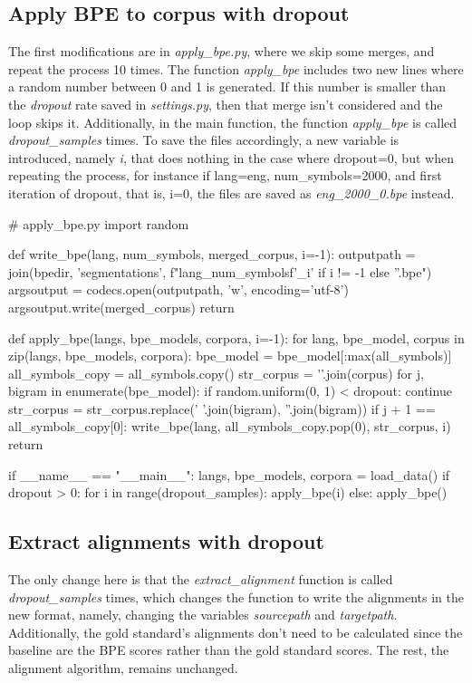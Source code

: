 \subsection{Apply BPE to corpus with dropout}

The first modifications are in \emph{apply\_bpe.py}, where we skip some merges, and repeat the process 10 times. The function \emph{apply\_bpe} includes two new lines where a random number between 0 and 1 is generated. If this number is smaller than the \emph{dropout} rate saved in \emph{settings.py}, then that merge isn't considered and the loop skips it. Additionally, in the main function, the function \emph{apply\_bpe} is called \emph{dropout\_samples} times. To save the files accordingly, a new variable is introduced, namely \emph{i}, that does nothing in the case where dropout=0, but when repeating the process, for instance if lang=eng, num\_symbols=2000, and first iteration of dropout, that is, i=0, the files are saved as \emph{eng\_2000\_0.bpe} instead.

\begin{python}
# apply_bpe.py
import random

def write_bpe(lang, num_symbols, merged_corpus, i=-1):
  outputpath = join(bpedir, 'segmentations', f"{lang}_{num_symbols}{f'_{i}' if i != -1 else ''}.bpe")
  argsoutput = codecs.open(outputpath, 'w', encoding='utf-8')
  argsoutput.write(merged_corpus)
  return

def apply_bpe(langs, bpe_models, corpora, i=-1):
  for lang, bpe_model, corpus in zip(langs, bpe_models, corpora):
    bpe_model = bpe_model[:max(all_symbols)]
    all_symbols_copy = all_symbols.copy()
    str_corpus = '\n'.join(corpus)
    for j, bigram in enumerate(bpe_model):
      if random.uniform(0, 1) < dropout:
        continue
      str_corpus = str_corpus.replace(' '.join(bigram), ''.join(bigram))
      if j + 1 == all_symbols_copy[0]:
        write_bpe(lang, all_symbols_copy.pop(0), str_corpus, i)
  return

if __name__ == "__main__":
  langs, bpe_models, corpora = load_data()
  if dropout > 0:
    for i in range(dropout_samples):
      apply_bpe(i)
  else:
      apply_bpe()
\end{python}

\subsection{Extract alignments with dropout}

The only change here is that the \emph{extract\_alignment} function is called \emph{dropout\_samples} times, which changes the function to write the alignments in the new format, namely, changing the variables \emph{sourcepath} and \emph{targetpath}. Additionally, the gold standard's alignments don't need to be calculated since the baseline are the BPE scores rather than the gold standard scores. The rest, the alignment algorithm, remains unchanged.

